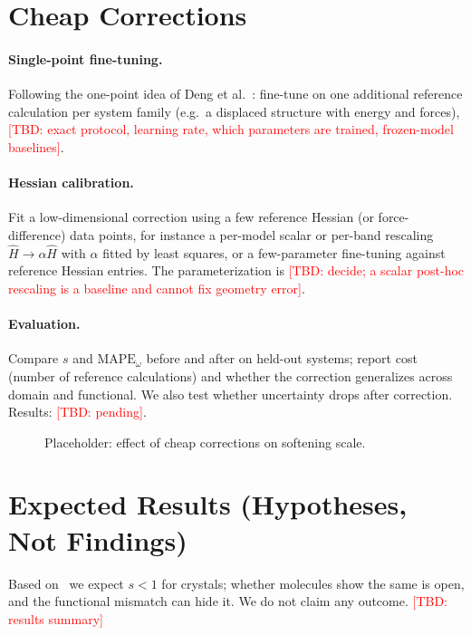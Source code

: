 \documentclass{article}
\newcommand{\TBD}[1]{\textcolor{red}{[TBD: #1]}}
\newcommand{\sfs}{s}      %
\begin{document}
\section{Cheap Corrections}\label{sec:correction}
\paragraph{Single-point fine-tuning.} Following the one-point idea of Deng et al.~\cite{deng2025softening}: fine-tune on one additional reference calculation per system family (e.g.\ a displaced structure with energy and forces), \TBD{exact protocol, learning rate, which parameters are trained, frozen-model baselines}.

\paragraph{Hessian calibration.} Fit a low-dimensional correction using a few reference Hessian (or force-difference) data points, for instance a per-model scalar or per-band rescaling $\hat H \to \alpha\hat H$ with $\alpha$ fitted by least squares, or a few-parameter fine-tuning against reference Hessian entries. The parameterization is \TBD{decide; a scalar post-hoc rescaling is a baseline and cannot fix geometry error}.

\paragraph{Evaluation.} Compare $\sfs$ and $\mathrm{MAPE}_\omega$ before and after on held-out systems; report cost (number of reference calculations) and whether the correction generalizes across domain and functional. We also test whether uncertainty drops after correction. Results: \TBD{pending}.

\begin{figure}[h]
\centering
\fbox{\parbox{0.8\linewidth}{\centering\vspace{2em}\TBD{$\sfs$ before/after for each correction, per model and domain}\vspace{2em}}}
\caption{Placeholder: effect of cheap corrections on softening scale.}
\end{figure}

\section{Expected Results (Hypotheses, Not Findings)}
Based on~\cite{deng2025softening} we expect $\sfs<1$ for crystals; whether molecules show the same is open, and the functional mismatch can hide it. We do not claim any outcome. \TBD{results summary}
\end{document}

